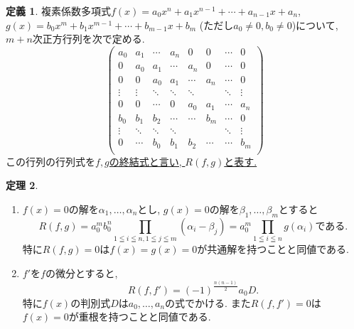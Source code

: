 \documentclass[dvipdfmx,a4paper,11pt]{article}
\theoremstyle{definition}
\newtheorem{thm}{定理}
\newtheorem{dfn}[thm]{定義}
\begin{document}
\begin{tcolorbox}[
    colback = white,
    colframe = green!35!black,
    fonttitle = \bfseries,
    breakable = true]
    \begin{dfn}
複素係数多項式$f(x) = a_0 x^{n} +  a_1 x^{n-1} +  \cdots +  a_{n-1} x + a_{n}$, 
$g(x) = b_0 x^{m} +  b_1 x^{m-1} +  \cdots +  b_{m-1} x + b_{m}$
(ただし$a_0 \neq 0, b_0 \neq 0$)について, $m+n$次正方行列を次で定める.
$$
 \begin{pmatrix}
 a_0 	& a_1& \cdots &a_n 	&0		&0 	     & \cdots&0 \\
0   		& a_0 & a_1		& \cdots &a_n 	&0 	      & \cdots&0 \\
 0 		& 0      & a_0 		&    a_1	& \cdots &a_n  & \cdots&0 \\
\vdots  & \vdots  &      \ddots 	&     \ddots &  \ddots     &   & \ddots&\vdots \\
   0		 & 0         &	 \cdots	&    0	& a_0 &a_1 & \cdots &a_n \\
 b_0 	& b_1& b_2 &  \cdots  	& \cdots		&b_m	     & \cdots&0 \\
\vdots 	&    \ddots 	&   \ddots    &   \ddots     & 		&   	    & \ddots&\vdots \\
0		&     \cdots 	&      b_0 & b_1 &  b_2  	&  \cdots& \cdots&b_m \\
 \end{pmatrix}
$$
この行列の行列式を\underline{$f,g$の終結式と言い, $R(f,g)$と表す.}
    \end{dfn}
 \end{tcolorbox}


\begin{tcolorbox}[
    colback = white,
    colframe = green!35!black,
    fonttitle = \bfseries,
    breakable = true]
    \begin{thm}
    \begin{enumerate}
\item $f(x) =0$の解を$\alpha_1, \ldots, \alpha_n$とし, $g(x) =0$の解を$\beta_1, \ldots, \beta_m$とすると
$$
R(f,g) = a_{0}^{m}b_{0}^{n} \prod_{1 \leqq i \leqq n, 1\leqq j \leqq m} (\alpha_i - \beta_j)
=a_{0}^{m} \prod_{1 \leqq i \leqq n} g(\alpha_{i})\text{である.}
$$
特に$R(f,g)=0$は$f(x)=g(x)=0$が共通解を持つことと同値である.
\item $f'$を$f$の微分とすると, 
$$
R(f, f') = (-1)^{\frac{n(n-1)}{2}} a_0 D.
$$
特に$f(x)$の判別式$D$は$a_0, \ldots, a_n$の式でかける. また$R(f,f')=0$は$f(x)=0$が重根を持つことと同値である.
    \end{enumerate}

    \end{thm}
 \end{tcolorbox}
 
\end{document}
